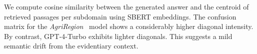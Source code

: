 \documentclass{ieeeaccess}
\newcommand{\AgriRegion}{\textit{AgriRegion}}
\begin{document}
We compute cosine similarity between the generated answer and the centroid of retrieved passages per subdomain using SBERT embeddings.
The confusion matrix for the \AgriRegion~ model shows a considerably higher diagonal intensity. By contrast, GPT-4-Turbo exhibits lighter diagonals. This  suggests a mild semantic drift from the evidentiary context.



\end{document}
